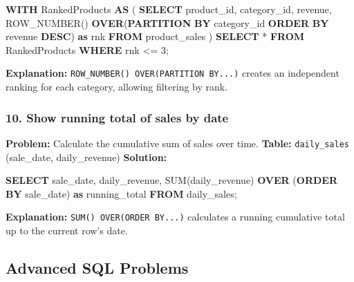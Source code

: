 \documentclass[
  11pt,
  openany,
  oneside]{book}
\newenvironment{Shaded}{}{}
\newcommand{\DecValTok}[1]{\textcolor[rgb]{0.25,0.63,0.44}{#1}}
\newcommand{\FunctionTok}[1]{\textcolor[rgb]{0.02,0.16,0.49}{#1}}
\newcommand{\KeywordTok}[1]{\textcolor[rgb]{0.00,0.44,0.13}{\textbf{#1}}}
\newcommand{\NormalTok}[1]{#1}
\newcommand{\OperatorTok}[1]{\textcolor[rgb]{0.40,0.40,0.40}{#1}}
\begin{document}
\begin{Shaded}
\begin{Highlighting}[]
\KeywordTok{WITH}\NormalTok{ RankedProducts }\KeywordTok{AS}\NormalTok{ (}
    \KeywordTok{SELECT} 
\NormalTok{        product\_id, }
\NormalTok{        category\_id, }
\NormalTok{        revenue,}
        \FunctionTok{ROW\_NUMBER}\NormalTok{() }\KeywordTok{OVER}\NormalTok{(}\KeywordTok{PARTITION} \KeywordTok{BY}\NormalTok{ category\_id }\KeywordTok{ORDER} \KeywordTok{BY}\NormalTok{ revenue }\KeywordTok{DESC}\NormalTok{) }\KeywordTok{as}\NormalTok{ rnk}
    \KeywordTok{FROM}\NormalTok{ product\_sales}
\NormalTok{)}
\KeywordTok{SELECT} \OperatorTok{*} \KeywordTok{FROM}\NormalTok{ RankedProducts }\KeywordTok{WHERE}\NormalTok{ rnk }\OperatorTok{\textless{}=} \DecValTok{3}\NormalTok{;}
\end{Highlighting}
\end{Shaded}

\textbf{Explanation:} \texttt{ROW\_NUMBER()\ OVER(PARTITION\ BY...)}
creates an independent ranking for each category, allowing filtering by
rank.

\subsubsection{10. Show running total of sales by
date}\label{show-running-total-of-sales-by-date}

\textbf{Problem:} Calculate the cumulative sum of sales over time.
\textbf{Table:} \texttt{daily\_sales} (sale\_date, daily\_revenue)
\textbf{Solution:}

\begin{Shaded}
\begin{Highlighting}[]
\KeywordTok{SELECT} 
\NormalTok{    sale\_date, }
\NormalTok{    daily\_revenue,}
    \FunctionTok{SUM}\NormalTok{(daily\_revenue) }\KeywordTok{OVER}\NormalTok{ (}\KeywordTok{ORDER} \KeywordTok{BY}\NormalTok{ sale\_date) }\KeywordTok{as}\NormalTok{ running\_total}
\KeywordTok{FROM}\NormalTok{ daily\_sales;}
\end{Highlighting}
\end{Shaded}

\textbf{Explanation:} \texttt{SUM()\ OVER(ORDER\ BY...)} calculates a
running cumulative total up to the current row's date.

\subsection{Advanced SQL Problems}\label{advanced-sql-problems}
\end{document}
